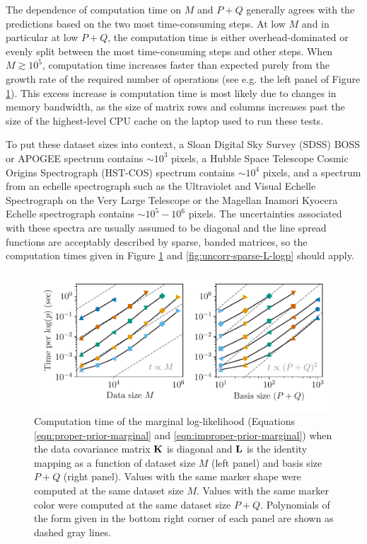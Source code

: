 \documentclass[manuscript]{aastex62}
\newcommand{\vx}[1]{{\bf {#1}}}
\begin{document}
The dependence of computation time on $M$ and $P+Q$ generally agrees with the predictions based on the two most time-consuming steps.
At low $M$ and in particular at low $P+Q$, the computation time is either overhead-dominated or evenly split between the most time-consuming steps and other steps.
When $M \gtrsim 10^5$, computation time increases faster than expected purely from the growth rate of the required number of operations (see e.g. the left panel of Figure \ref{fig:uncorr-no-L-logp}).
This excess increase is computation time is most likely due to changes in memory bandwidth, as the size of matrix rows and columns increases past the size of the highest-level CPU cache on the laptop used to run these tests.

To put these dataset sizes into context, a Sloan Digital Sky Survey (SDSS) BOSS or APOGEE spectrum contains $\sim 10^3$ pixels, a Hubble Space Telescope Cosmic Origins Spectrograph (HST-COS) spectrum contains $\sim 10^4$ pixels, and a spectrum from an echelle spectrograph such as the Ultraviolet and Visual Echelle Spectrograph on the Very Large Telescope or the Magellan Inamori Kyocera Echelle spectrograph contains $\sim 10^5 - 10^6$ pixels.
The uncertainties associated with these spectra are usually assumed to be diagonal and the line spread functions are acceptably described by sparse, banded matrices, so the computation times given in Figure \ref{fig:uncorr-no-L-logp} and \ref{fig:uncorr-sparse-L-logp} should apply.

\begin{figure}
  \includegraphics{uncorr_no_L_scaling.pdf}
  \caption{Computation time of the marginal log-likelihood (Equations \ref{eqn:proper-prior-marginal} and \ref{eqn:improper-prior-marginal}) when the data covariance matrix $\vx{K}$ is diagonal and $\vx{L}$ is the identity mapping as a function of dataset size $M$ (left panel) and basis size $P+Q$ (right panel). Values with the same marker shape were computed at the same dataset size $M$. Values with the same marker color were computed at the same dataset size $P+Q$. Polynomials of the form given in the bottom right corner of each panel are shown as dashed gray lines.}
  \label{fig:uncorr-no-L-logp}
\end{figure}
\end{document}
